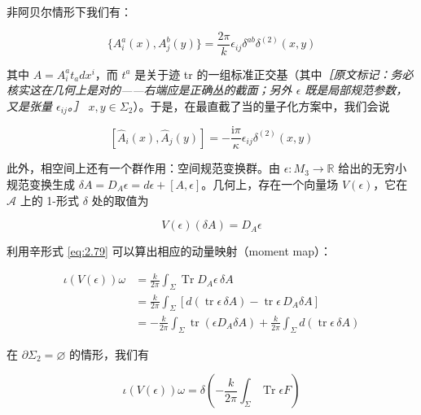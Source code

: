 非阿贝尔情形下我们有：

\begin{equation}
  \{A^{a}_{i}(x),A^{b}_{j}(y)\}=\frac{2\pi}{k}\epsilon_{ij}\delta^{ab}\delta^{(2)}(x,y)
  \tag{2.86}
  \label{eq:2.86}
\end{equation}

其中 $A=A^{a}_{i}t_adx^{i}$，而 $t^{a}$ 是关于迹 tr 的一组标准正交基（其中{\small\itshape ［原文标记：务必核实这在几何上是对的——右端应是正确丛的截面；另外 $\epsilon$ 既是局部规范参数，又是张量 $\epsilon_{ij}$。］}%
$x,y\in\Sigma_2$）。于是，在最直截了当的量子化方案中，我们会说

\begin{equation}
  \left[\hat A_i(x),\hat A_j(y)\right]=-\frac{\mathrm{i}\pi}{\kappa}\epsilon_{ij}\delta^{(2)}(x,y)
  \tag{2.87}
  \label{eq:2.87}
\end{equation}

此外，相空间上还有一个群作用：空间规范变换群。由 $\epsilon:M_3\to\mathbb{R}$ 给出的无穷小规范变换生成 $\delta A=D_A\epsilon=d\epsilon+[A,\epsilon]$。几何上，存在一个向量场 $V(\epsilon)$，它在 $\mathcal{A}$ 上的 1-形式 $\delta$ 处的取值为

\begin{equation}
  V(\epsilon)(\delta A)=D_A\epsilon
  \tag{2.88}
  \label{eq:2.88}
\end{equation}

利用辛形式 \eqref{eq:2.79} 可以算出相应的动量映射（moment map）：

\begin{equation}
  \begin{aligned}
    \iota(V(\epsilon))\omega&=\frac{k}{2\pi}\int_{\Sigma}\operatorname{Tr}D_A\epsilon\,\delta A\\
    &=\frac{k}{2\pi}\int_{\Sigma}\left[d\left(\operatorname{tr}\epsilon\,\delta A\right)-\operatorname{tr}\epsilon\,D_A\delta A\right]\\
    &=-\frac{k}{2\pi}\int_{\Sigma}\operatorname{tr}\left(\epsilon D_A\delta A\right)+\frac{k}{2\pi}\int_{\Sigma}d\left(\operatorname{tr}\epsilon\,\delta A\right)
  \end{aligned}
  \tag{2.89}
  \label{eq:2.89}
\end{equation}

在 $\partial\Sigma_2=\varnothing$ 的情形，我们有

\begin{equation}
  \iota(V(\epsilon))\omega=\delta\left(-\frac{k}{2\pi}\int_{\Sigma}\operatorname{Tr}\epsilon F\right)
  \tag{2.90}
  \label{eq:2.90}
\end{equation}

